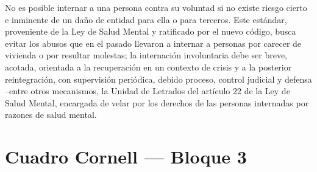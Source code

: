 \documentclass[12pt,oneside]{book}
\begin{document}
No es posible internar a una persona contra su voluntad si no existe riesgo cierto e inminente de un daño de entidad para ella o para terceros. Este estándar, proveniente de la Ley de Salud Mental y ratificado por el nuevo código, busca evitar los abusos que en el pasado llevaron a internar a personas por carecer de vivienda o por resultar molestas; la internación involuntaria debe ser breve, acotada, orientada a la recuperación en un contexto de crisis y a la posterior reintegración, con supervisión periódica, debido proceso, control judicial y defensa --entre otros mecanismos, la Unidad de Letrados del artículo 22 de la Ley de Salud Mental, encargada de velar por los derechos de las personas internadas por razones de salud mental.

\section{Cuadro Cornell --- Bloque 3}
\end{document}
